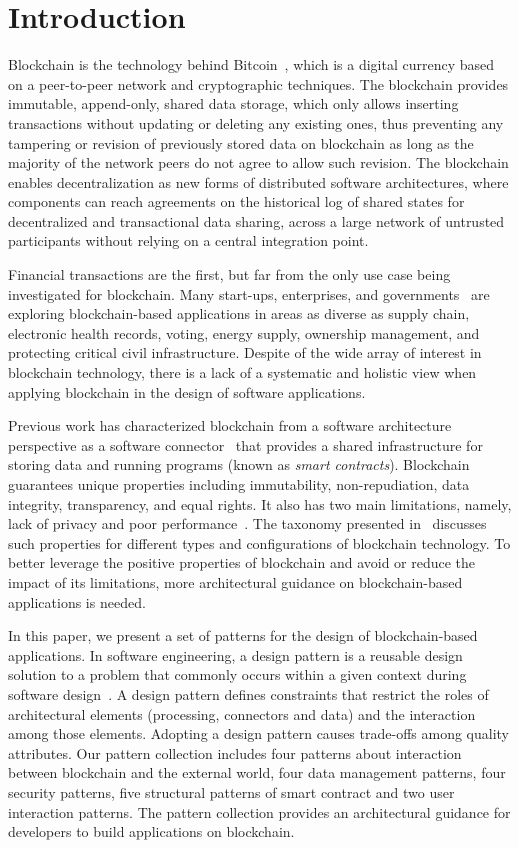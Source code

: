 \section{Introduction}

Blockchain is the technology behind Bitcoin~\cite{Satoshi:bitcoin}, which is a digital currency based on a peer-to-peer network and cryptographic techniques. The blockchain provides immutable, append-only, shared data storage, which only allows inserting transactions without updating or deleting any existing ones, thus preventing any tampering or revision of previously stored data on blockchain as long as the majority of the network peers do not agree to allow such revision. The blockchain enables decentralization as new forms of distributed software architectures, where components can reach agreements on the historical log of shared states for decentralized and transactional data sharing, across a large network of untrusted participants without relying on a central integration point.

Financial transactions are the first, but far from the only use case being investigated for blockchain. Many start-ups, enterprises, and governments~\cite{ukreport} are exploring blockchain-based applications in areas as diverse as supply chain, electronic health records, voting, energy supply, ownership management, and protecting critical civil infrastructure. Despite of the wide array of interest in blockchain technology, there is a lack of a systematic and holistic view when applying blockchain in the design of software applications.

Previous work has characterized blockchain from a software architecture perspective as a software connector~\cite{sherry2016} that provides a shared infrastructure for storing data and running programs (known as \emph{smart contracts}). Blockchain guarantees unique properties including immutability, non-repudiation, data integrity, transparency, and equal rights. It also has two main limitations, namely, lack of privacy and poor performance~\cite{sherry2016}. The taxonomy presented in~\cite{Sherry:ICSA2017} discusses such properties for different types and configurations of blockchain technology. To better leverage the positive properties of blockchain and avoid or reduce the impact of its limitations, more architectural guidance on blockchain-based applications is needed.

In this paper, we present a set of patterns for the design of blockchain-based applications. In software engineering, a design pattern is a reusable design solution to a problem that commonly occurs within a given context during software design~\cite{Beck1987}. A design pattern defines constraints that restrict the roles of architectural elements (processing, connectors and data) and the interaction among those elements. Adopting a design pattern causes trade-offs among quality attributes. Our pattern collection includes four patterns about interaction between blockchain and the external world, four data management patterns, four security patterns, five structural patterns of smart contract and two user interaction patterns. The pattern collection provides an architectural guidance for developers to build applications on blockchain. 

